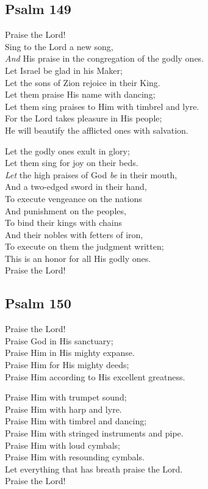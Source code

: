 \documentclass[14pt]{extbook}
\begin{document}
\newpage
\hypertarget{psalm-149}{%
\subsection{Psalm 149}\label{psalm-149}}

Praise the Lord!\\
Sing to the Lord a new song,\\
\emph{And} His praise in the congregation of the godly ones.\\
Let Israel be glad in his Maker;\\
Let the sons of Zion rejoice in their King.\\
Let them praise His name with dancing;\\
Let them sing praises to Him with timbrel and lyre.\\
For the Lord takes pleasure in His people;\\
He will beautify the afflicted ones with salvation.

Let the godly ones exult in glory;\\
Let them sing for joy on their beds.\\
\emph{Let} the high praises of God \emph{be} in their mouth,\\
And a two-edged sword in their hand,\\
To execute vengeance on the nations\\
And punishment on the peoples,\\
To bind their kings with chains\\
And their nobles with fetters of iron,\\
To execute on them the judgment written;\\
This is an honor for all His godly ones.\\
Praise the Lord!

\hypertarget{psalm-150}{%
\subsection{Psalm 150}\label{psalm-150}}

Praise the Lord!\\
Praise God in His sanctuary;\\
Praise Him in His mighty expanse.\\
Praise Him for His mighty deeds;\\
Praise Him according to His excellent greatness.

Praise Him with trumpet sound;\\
Praise Him with harp and lyre.\\
Praise Him with timbrel and dancing;\\
Praise Him with stringed instruments and pipe.\\
Praise Him with loud cymbals;\\
Praise Him with resounding cymbals.\\
Let everything that has breath praise the Lord.\\
Praise the Lord!
\end{document}
